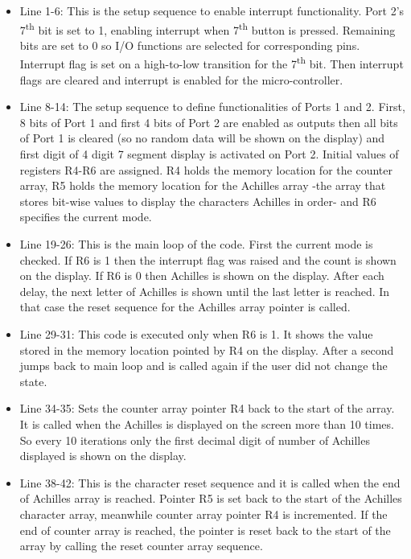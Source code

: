 \documentclass[pdftex,12pt,a4paper]{article}
\begin{document}
\begin{itemize}
    \item Line 1-6: This is the setup sequence to enable interrupt functionality. Port 2's 7\textsuperscript{th} bit is set to 1, enabling interrupt when 7\textsuperscript{th} button is pressed. Remaining bits are set to 0 so I/O functions are selected for corresponding pins. Interrupt flag is set on a high-to-low transition for the 7\textsuperscript{th} bit. Then interrupt flags are cleared and interrupt is enabled for the micro-controller.
    \item Line 8-14: The setup sequence to define functionalities of Ports 1 and 2. First, 8 bits of Port 1 and first 4 bits of Port 2 are enabled as outputs then all bits of Port 1 is cleared (so no random data will be shown on the display) and first digit of 4 digit 7 segment display is activated on Port 2. Initial values of registers R4-R6 are assigned. R4 holds the memory location for the counter array, R5 holds the memory location for the Achilles array -the array that stores bit-wise values to display the characters Achilles in order- and R6 specifies the current mode.
    \item Line 19-26: This is the main loop of the code. First the current mode is checked. If R6 is 1 then the interrupt flag was raised and the count is shown on the display. If R6 is 0 then Achilles is shown on the display. After each delay, the next letter of Achilles is shown until the last letter is reached. In that case the reset sequence for the Achilles array pointer is called.
    \item Line 29-31: This code is executed only when R6 is 1. It shows the value stored in the memory location pointed by R4 on the display. After a second jumps back to main loop and is called again if the user did not change the state.
    \item Line 34-35: Sets the counter array pointer R4 back to the start of the array. It is called when the Achilles is displayed on the screen more than 10 times. So every 10 iterations only the first decimal digit of number of Achilles displayed is shown on the display.
    \item Line 38-42: This is the character reset sequence and it is called when the end of Achilles array is reached. Pointer R5 is set back to the start of the Achilles character array, meanwhile counter array pointer R4 is incremented. If the end of counter array is reached, the pointer is reset back to the start of the array by calling the reset counter array sequence.

\end{itemize}
\end{document}
